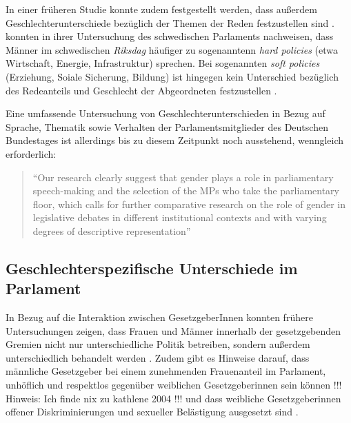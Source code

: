 \documentclass[12pt, 
    twoside=false, 
    bibliography=totoc, 
    numbers=endperiod, 
    headings=normal, 
    toc=chapterentrydotfill
    ]{scrbook}
\begin{document}
In einer früheren Studie konnte zudem festgestellt werden, dass außerdem Geschlechterunterschiede bezüglich der Themen der Reden festzustellen sind \parencite[514f.]{back_2014}. \textcite{back_2014} konnten in ihrer Untersuchung des schwedischen Parlaments nachweisen, dass Männer im schwedischen \emph{Riksdag} häufiger zu sogenanntenn \emph{hard policies} (etwa Wirtschaft, Energie, Infrastruktur) sprechen. Bei sogenannten \emph{soft policies} (Erziehung, Soiale Sicherung, Bildung) ist hingegen kein Unterschied bezüglich des Redeanteils und Geschlecht der Abgeordneten festzustellen \parencite[514f.]{back_2014}. 

Eine umfassende Untersuchung von Geschlechterunterschieden in Bezug auf Sprache, Thematik sowie Verhalten der Parlamentsmitglieder des Deutschen Bundestages ist allerdings bis zu diesem Zeitpunkt noch ausstehend, wenngleich erforderlich: 

\citereset
\begin{quote}
 \enquote{Our research clearly suggest that gender plays a role in parliamentary speech-making and the selection of the MPs who take the parliamentary floor, which calls for further comparative research on the role of gender in legislative  debates in different institutional contexts and with varying degrees of descriptive representation}
  \parencite[515]{back_2014}
\end{quote}

\subsection{Geschlechterspezifische Unterschiede im Parlament}\label{kapitel:geschlechterunterschiede}

In Bezug auf die Interaktion zwischen GesetzgeberInnen konnten frühere Untersuchungen zeigen, dass Frauen und Männer innerhalb der gesetzgebenden Gremien nicht nur unterschiedliche Politik betreiben, sondern außerdem unterschiedlich behandelt werden \parencites[201]{erikson_2018}{childs_2004}. Zudem gibt es Hinweise darauf, dass männliche Gesetzgeber bei einem zunehmenden Frauenanteil im Parlament, unhöflich und respektlos gegenüber weiblichen Gesetzgeberinnen sein können \parencites[201]{erikson_2018}{kathlene_1994}{kathlene_2004} !!! Hinweis: Ich finde nix zu kathlene 2004 !!! und dass weibliche Gesetzgeberinnen offener Diskriminierungen und sexueller Belästigung ausgesetzt sind \parencites[201]{erikson_2018}[76]{lovenduski_2005}{lovenduski_2004}.
\end{document}
